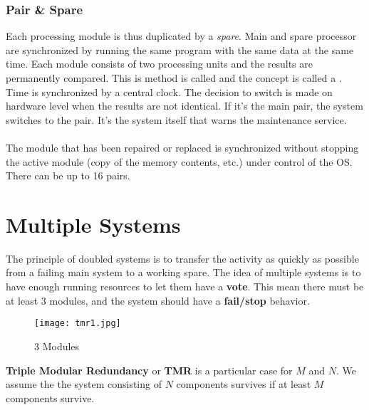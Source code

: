 \documentclass[../main.tex]{subfiles}
\begin{document}
\subsubsection{Pair \& Spare}
Each processing module is thus duplicated by a \textit{spare}.
Main and spare processor are synchronized by running the same program with the same data at the same time.
Each module consists of two processing units and the results are permanently compared.
This is method is called  and the concept is called a .
Time is synchronized by a central clock.
The decision to switch is made on hardware level when the results are not identical.
If it's the main pair, the system switches to the pair.
It's the system itself that warns the maintenance service. 
\\\\
The module that has been repaired or replaced is synchronized without stopping the active module (copy of the memory contents, etc.) under control of the OS. There can be up to 16 pairs.

\section{Multiple Systems}
The principle of doubled systems is to transfer the activity as quickly as possible from a failing main system to a working spare. The idea of multiple systems is to have enough running resources to let them have a \textbf{vote}. This mean there must be at least 3 modules, and the system should have a \textbf{fail/stop} behavior.

\begin{figure}[H]
    \centering
    \texttt{[image: tmr1.jpg]}
    \caption{3 Modules}
    \label{tmr1}
\end{figure}
\textbf{Triple Modular Redundancy} or \textbf{TMR} is a particular case for $M$ and $N$. We assume the the system consisting of $N$ components survives if at least $M$ components survive.
\end{document}
